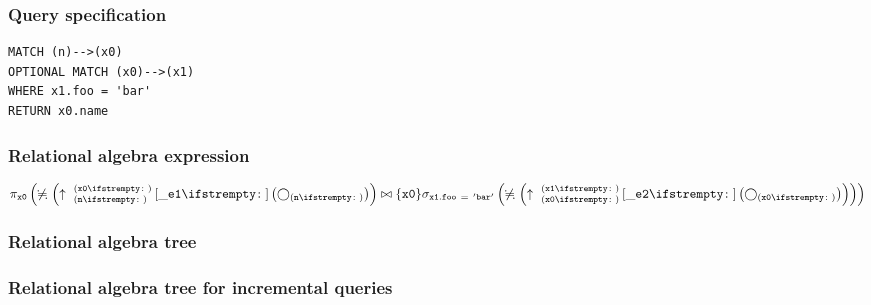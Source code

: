 \subsubsection*{Query specification}

\begin{lstlisting}
MATCH (n)-->(x0)
OPTIONAL MATCH (x0)-->(x1)
WHERE x1.foo = 'bar'
RETURN x0.name
\end{lstlisting}

\subsubsection*{Relational algebra expression}

$\projection{\var{x0}} \left(\alldifferent{} \left(\expandout{n}{x0}{}{\_e1}{} \left(\getvertices{n}{}\right)\right) \join \{\var{x0}\} \selection{\mathtt{x1.foo~=~'bar'}} \left(\alldifferent{} \left(\expandout{x0}{x1}{}{\_e2}{} \left(\getvertices{x0}{}\right)\right)\right)\right)$

\subsubsection*{Relational algebra tree}


\subsubsection*{Relational algebra tree for incremental queries}

